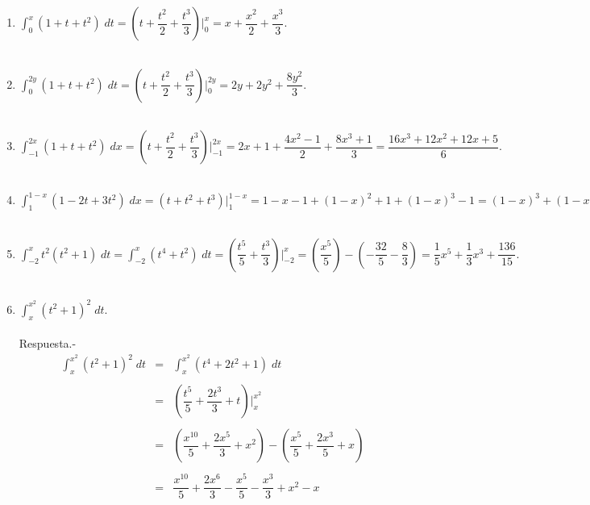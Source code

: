 \begin{enumerate}[\bfseries  1.]

    \item $\displaystyle\int_0^x (1+t+t^2)\; dt = \left(t+\dfrac{t^2}{2}+\dfrac{t^3}{3}\right)\bigg|_0^x = x+\dfrac{x^2}{2}+\dfrac{x^3}{3}.$\\\\

    \item $\displaystyle\int_0^{2y} (1+t+t^2)\; dt = \left(t+\dfrac{t^2}{2}+\dfrac{t^3}{3}\right)\bigg|_0^{2y} = 2y + 2y^2 + \dfrac{8y^2}{3}.$\\\\

    \item $\displaystyle\int_{-1}^{2x} (1+t+t^2)\; dx = \left(t+\dfrac{t^2}{2}+\dfrac{t^3}{3}\right)\bigg|_{-1}^{2x} = 2x+1 + \dfrac{4x^2 -1}{2} + \dfrac{8x^3 + 1}{3} = \dfrac{16x^3+12x^2+12x+5}{6}.$\\\\

    \item $\displaystyle\int_1^{1-x} (1-2t+3t^2)\; dx = \left(t + t^2 + t^3\right)\bigg|_1^{1-x} = 1-x - 1 + (1-x)^2 + 1 + (1-x)^3 - 1 = (1-x)^3 + (1-x)^2 + (1 - x) - 1 = -x^3 + 2x^2 - 2x$\\\\

    \item $\displaystyle\int_{-2}^{x}t^2(t^2+1)\; dt = \int_{-2}^x (t^4+t^2)\; dt = \left(\dfrac{t^5}{5}+\dfrac{t^3}{3}\right)\bigg|_{-2}^x = \left(\dfrac{x^5}{5}\right) - \left(-\dfrac{32}{5}-\dfrac{8}{3}\right) = \dfrac{1}{5}x^5+\dfrac{1}{3}x^3+\dfrac{136}{15}.$\\\\

    \item $\displaystyle\int_x^{x^2} (t^2+1)^2\; dt.$\\\\
	Respuesta.-\; $$\begin{array}{rcl}
	    \displaystyle\int_x^{x^2}(t^2+1)^2\; dt&=&\displaystyle\int_x^{x^2}(t^4+2t^2+1)\; dt\\\\
						   &=&\left(\dfrac{t^5}{5}+\dfrac{2t^3}{3}+t\right)\bigg|_x^{x^2}\\\\
						   &=&\left(\dfrac{x^10}{5}+\dfrac{2x^5}{3}+x^2\right)-\left(\dfrac{x^5}{5}+\dfrac{2x^3}{5}+x\right)\\\\
						   &=&\dfrac{x^{10}}{5}+\dfrac{2x^6}{3}-\dfrac{x^5}{5}-\dfrac{x^3}{3}+x^2-x\\\\
	\end{array}$$


\end{enumerate}
